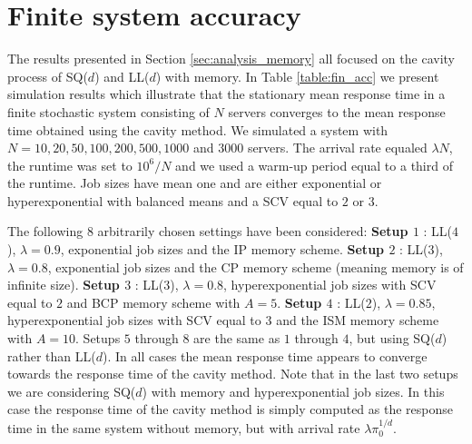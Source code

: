 \documentclass[12pt]{report}
\begin{document}
\section{Finite system accuracy}\label{sec:finAcc}

The results presented in Section \ref{sec:analysis_memory} all focused on the cavity process
of SQ($d$) and LL($d$) with memory. In Table \ref{table:fin_acc} we present simulation results which illustrate that the stationary mean response time in a finite stochastic system consisting of $N$
servers converges to the mean response time obtained using the cavity method.
We simulated a system with $N=10,20,50,100,200,500,1000$ and $3000$ servers. The arrival rate equaled $\lambda N$, the runtime was set to $10^6/N$ and we used a warm-up period equal to a third of the runtime. Job sizes have mean one and are either exponential or hyperexponential with balanced means and a SCV equal to $2$ or $3$. 

The following $8$ arbitrarily chosen settings have been considered:
\newline
\textbf{Setup $1$} : LL($4$), $\lambda =0.9$, exponential job sizes and the IP memory scheme.
\newline
\textbf{Setup $2$} : LL($3$), $\lambda=0.8$, exponential job sizes and the CP memory scheme
(meaning memory is of infinite size).
\newline
\textbf{Setup $3$} : LL($3$), $\lambda=0.8$, hyperexponential job sizes with SCV equal to $2$ and BCP memory scheme with $A=5$.
\newline
\textbf{Setup $4$} : LL($2$), $\lambda=0.85$, hyperexponential job sizes with SCV equal to $3$ and the ISM memory scheme with $A=10$.
\newline
Setups $5$ through $8$ are the same as $1$ through $4$, but using SQ($d$) rather than LL($d$).
In all cases the mean response time appears to converge towards the response time of the cavity method.
Note that in the last two setups we are considering SQ($d$) with memory and hyperexponential
job sizes. In this case the response time of the cavity method is simply computed as the
response time in the same system without memory, but with arrival rate $\lambda \pi_0^{1/d}$. %
\end{document}
